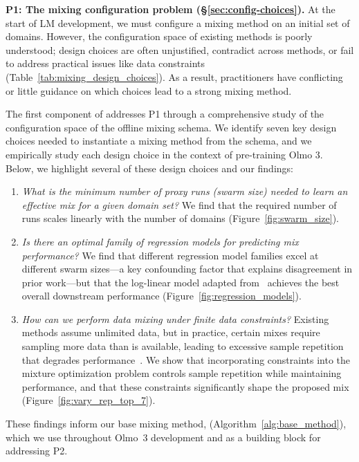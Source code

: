 \textbf{P1: The mixing configuration problem (\S\ref{sec:config-choices}).} At the start of LM development, we must configure a mixing method on an initial set of domains. However, the configuration space of existing methods is poorly understood; design choices are often unjustified, contradict across methods, or fail to address practical issues like data constraints (Table~\ref{tab:mixing_design_choices}). 
As a result, practitioners have conflicting or little guidance on which choices lead to a strong mixing method.


The first component of \olmix addresses P1 through a comprehensive study of the configuration space of the offline mixing schema. 
We identify seven key design choices needed to instantiate a mixing method from the schema, and we empirically study each design choice in the context of pre-training Olmo 3. Below, we highlight several of these design choices and our findings:
\begin{enumerate}[itemsep=0pt, topsep=2pt, leftmargin=12pt]
    \item \emph{What is the minimum number of proxy runs (swarm size) needed to learn an effective mix for a given domain set?} 
    We find that the required number of runs scales linearly with the number of domains (Figure~\ref{fig:swarm_size}).

    \item \emph{Is there an optimal family of regression models for predicting mix performance?}
    We find that different regression model families excel at different swarm sizes---a key confounding factor that explains disagreement in prior work---but that the log-linear model adapted from~\citet{ye2025datamixinglawsoptimizing} achieves the best overall downstream performance (Figure~\ref{fig:regression_models}).   
        
    \item \emph{How can we perform data mixing under finite data constraints?} Existing methods assume unlimited data, but in practice, certain mixes require sampling more data than is available, leading to excessive sample repetition that degrades performance~\citep{muennighoff2025scalingdataconstrainedlanguagemodels}. We show that incorporating constraints into the mixture optimization problem controls sample repetition while maintaining performance, and that these constraints significantly shape the proposed mix (Figure~\ref{fig:vary_rep_top_7}).    
\end{enumerate}

These findings inform our base mixing method, \base (Algorithm~\ref{alg:base_method}), which we use throughout Olmo~3 development and as a building block for addressing P2.

